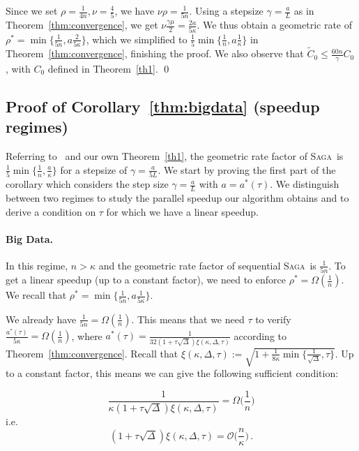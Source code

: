 \documentclass[twoside]{article}
\newcommand{\stepsize}{\gamma}
\newcommand{\strongconvex}{\mu}
\newcommand{\overlap}{\tau}
\newcommand{\contraction}{\rho}
\newcommand{\sparsity}{\Delta}
\newcommand{\lipschitz}{L}
\newcommand{\SAGA}{\textsc{Saga}}
\begin{document}
Since we set $\contraction = \frac{1}{4n}, \nu = \frac{4}{5}$, we have $\nu \contraction = \frac{1}{5n}$.
Using a stepsize $\stepsize = \frac{a}{\lipschitz}$ as in Theorem~\ref{thm:convergence}, we get $\nu \frac{\stepsize \strongconvex}{2} = \frac{2a}{5 \kappa}$.
We thus obtain a geometric rate of $\contraction^* = \min \{\frac{1}{5n}, a\frac{2}{5\kappa}\}$, which we simplified to $\frac{1}{5} \min \{\frac{1}{n}, a\frac{1}{\kappa}\}$ in Theorem~\ref{thm:convergence}, finishing the proof. We also observe that $\tilde C_0 \leq \frac{60n}{\stepsize} C_0$, with $C_0$ defined in Theorem~\ref{th1}.
\qed

\subsection{Proof of Corollary~\ref{thm:bigdata} (speedup regimes)}
Referring to~\citet{qsaga} and our own Theorem~\ref{th1}, the geometric rate factor of \SAGA\ is $\frac{1}{5}\min\{\frac{1}{n}, \frac{a}{\kappa}\}$ for a stepsize of $\stepsize = \frac{a}{5L}$. We start by proving the first part of the corollary which considers the step size $\stepsize = \frac{a}{L}$ with $a = a^*(\overlap)$.
We distinguish between two regimes to study the parallel speedup our algorithm obtains and to derive a condition on $\overlap$ for which we have a linear speedup.

\paragraph{Big Data.} 
In this regime, $n > \kappa$ and the geometric rate factor of sequential \SAGA\ is $\frac{1}{5n}$. 
To get a linear speedup (up to a constant factor), we need to enforce $\contraction^* = \Omega(\frac{1}{n})$.
We recall that $\contraction^* = \min \{\frac{1}{5n}, a\frac{1}{5\kappa}\}$.

We already have $\frac{1}{5n} = \Omega(\frac{1}{n})$. This means that we need $\overlap$ to verify $\frac{a^*(\overlap)}{5\kappa} = \Omega(\frac{1}{n})$, where $a^*(\overlap) = \frac{1}{32 \left(1+ \overlap  \sqrt \sparsity \right) \xi(\kappa, \sparsity, \overlap)}$ according to Theorem~\ref{thm:convergence}.
Recall that $\xi(\kappa, \sparsity, \overlap) := \sqrt{1 + \frac{1}{8 \kappa}  \min\{\frac{1}{\sqrt{\sparsity}}, \overlap\} }$.
Up to a constant factor, this means we can give the following sufficient condition:

\begin{equation}
\frac{1}{\kappa \left(1+ \overlap  \sqrt \sparsity \right) \xi(\kappa, \sparsity, \overlap)}
= \Omega \Big(\frac{1}{n}\Big)
\end{equation}
i.e. 
\begin{equation} \label{eq:SufficientCondition}
\left(1+ \overlap  \sqrt \sparsity \right) \xi(\kappa, \sparsity, \overlap)
= \mathcal{O} \Big( \frac{n}{\kappa} \Big) \, .
\end{equation}
\end{document}

